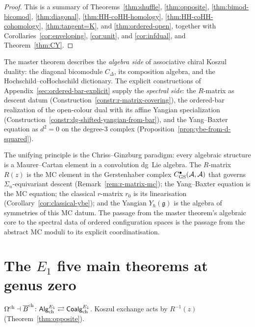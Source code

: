 \begin{proof}
This is a summary of Theorems~\ref{thm:shuffle}, \ref{thm:opposite},
\ref{thm:bimod-bicomod}, \ref{thm:diagonal}, \ref{thm:HH-coHH-homology},
\ref{thm:HH-coHH-cohomology}, \ref{thm:tangent=K}, and \ref{thm:ordered-open}, together with
Corollaries~\ref{cor:enveloping}, \ref{cor:unit}, and \ref{cor:infdual}, and
Theorem~\ref{thm:CY}.
\end{proof}

\begin{remark}
The master theorem describes the \emph{algebra side} of associative chiral
Koszul duality: the diagonal bicomodule $C_\Delta$, its composition
algebra, and the Hochschild--coHochschild dictionary. The explicit
constructions of Appendix~\ref{sec:ordered-bar-explicit} supply the
\emph{spectral side}: the $R$-matrix as descent datum
(Construction~\ref{constr:r-matrix-covering}), the ordered-bar
realization of the open-colour dual with its affine Yangian
specialization
(Construction~\ref{constr:dg-shifted-yangian-from-bar}), and the
Yang--Baxter equation as $d^2=0$ on the degree-$3$ complex
(Proposition~\ref{prop:ybe-from-d-squared}).

The unifying principle is the Chriss--Ginzburg paradigm: every algebraic
structure is a Maurer--Cartan element in a convolution dg~Lie algebra.
The $R$-matrix $R(z)$ is the MC element in the Gerstenhaber complex
$C^\bullet_{\mathrm{GS}}(\mathcal{A},\mathcal{A})$ that governs $\Sigma_n$-equivariant
descent (Remark~\ref{rem:r-matrix-mc}); the Yang--Baxter equation is the
MC equation; the classical $r$-matrix $r_0$ is its linearisation
(Corollary~\ref{cor:classical-ybe}); and the Yangian $Y_\hbar(\mathfrak g)$
is the algebra of symmetries of this MC datum. The passage from the master
theorem's algebraic core to the spectral data of ordered
configuration spaces is the passage from the abstract MC moduli to its
explicit coordinatisation.
\end{remark}

\section{The \texorpdfstring{$E_1$}{E1} five main theorems at genus zero}

\begin{theorem}
$\Omega^{\mathrm{ch}} \dashv \overline{B}^{\mathrm{ch}}\colon
\mathsf{Alg}^{E_1}_{\mathrm{ch}} \rightleftarrows
\mathsf{Coalg}^{E_1}_{\mathrm{ch}}$.
Koszul exchange acts by $R^{-1}(z)$
\textup{(}Theorem~\textup{\ref{thm:opposite}}).
\end{theorem}

